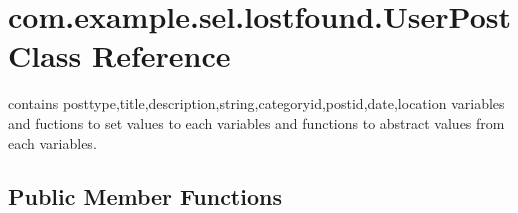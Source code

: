 \hypertarget{classcom_1_1example_1_1sel_1_1lostfound_1_1UserPost}{}\section{com.\+example.\+sel.\+lostfound.\+User\+Post Class Reference}
\label{classcom_1_1example_1_1sel_1_1lostfound_1_1UserPost}


contains posttype,title,description,string,categoryid,postid,date,location variables and fuctions to set values to each variables and functions to abstract values from each variables.  


\subsection*{Public Member Functions}
